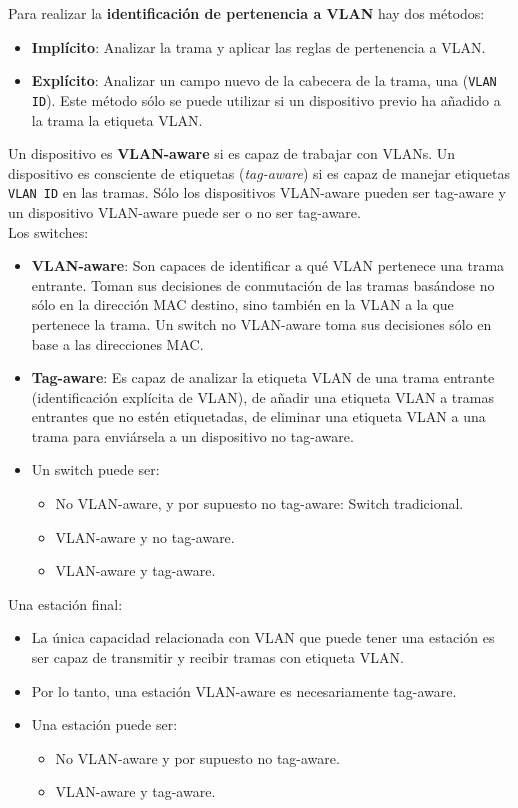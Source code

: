 \documentclass[10pt,portrait, twocolumn]{article}
\begin{document}
Para realizar la \textbf{identificación de pertenencia a VLAN} hay dos métodos:

	\begin{itemize}
	\item \textbf{Implícito}: Analizar la trama y aplicar las reglas de pertenencia a VLAN.
	\item \textbf{Explícito}: Analizar un campo nuevo de la cabecera de la trama, una (\texttt{VLAN ID}). Este método sólo se puede utilizar si un dispositivo previo ha añadido a la trama la etiqueta VLAN.
	\end{itemize}
	
Un dispositivo es \textbf{VLAN-aware} si es capaz de trabajar con VLANs. Un dispositivo es consciente de etiquetas (\textit{tag-aware}) si es capaz de manejar etiquetas \texttt{VLAN ID} en las tramas. Sólo los dispositivos VLAN-aware pueden ser tag-aware y un dispositivo VLAN-aware puede ser o no ser tag-aware.\\

Los switches:

	\begin{itemize}
	\item \textbf{VLAN-aware}: Son capaces de identificar a qué VLAN pertenece una trama entrante. Toman sus decisiones de conmutación de las tramas basándose no sólo en la dirección MAC destino, sino también en la VLAN a la que pertenece la trama. Un switch no VLAN-aware toma sus decisiones sólo en base a las direcciones MAC.
	\item \textbf{Tag-aware}: Es capaz de analizar la etiqueta VLAN de una trama entrante (identificación explícita de VLAN), de añadir una etiqueta VLAN a tramas entrantes que no estén etiquetadas, de eliminar una etiqueta VLAN a una trama para enviársela a un dispositivo no tag-aware.
	\item Un switch puede ser:
		\begin{itemize}
		\item No VLAN-aware, y por supuesto no tag-aware: Switch tradicional.
		\item VLAN-aware y no tag-aware.
		\item VLAN-aware y tag-aware.
		\end{itemize}
	\end{itemize}
	
Una estación final:

	\begin{itemize}
		\item La única capacidad relacionada con VLAN que puede tener una estación es ser capaz de transmitir y recibir tramas con etiqueta VLAN.
		\item Por lo tanto, una estación VLAN-aware es necesariamente tag-aware.
		\item Una estación puede ser:
		
			\begin{itemize}
			\item No VLAN-aware y por supuesto no tag-aware.
			\item VLAN-aware y tag-aware.
			\end{itemize}
	\end{itemize}	
	
\end{document}
